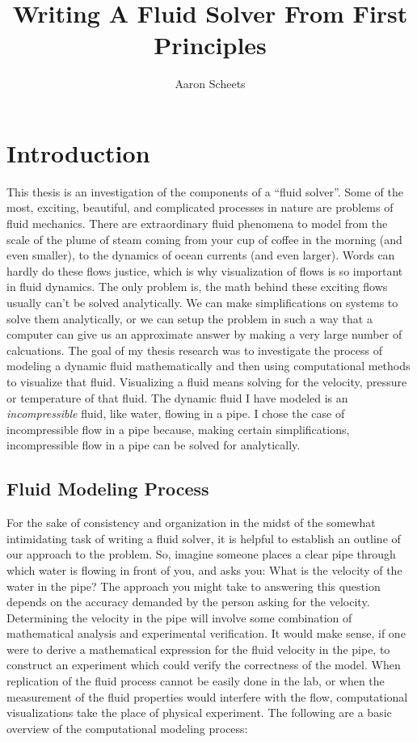 \documentclass[twocolumn,12pth]{article}
\title{Writing A Fluid Solver From First Principles}
\author{Aaron Scheets}
\begin{document}
\doublespacing

\maketitle

\section{Introduction}

This thesis is an investigation of the components of a ``fluid solver''.
Some of the most, exciting, beautiful, and complicated processes in nature are problems of fluid mechanics.
There are extraordinary fluid phenomena to model from the scale of the plume of steam coming from your cup of coffee in the morning (and even smaller), to the dynamics of ocean currents (and even larger).
Words can hardly do these flows justice, which is why visualization of flows is so important in fluid dynamics.
The only problem is, the math behind these exciting flows usually can't be solved analytically. 
We can make simplifications on systems to solve them analytically, or we can setup the problem in such a way that a computer can give us an approximate answer by making a very large number of calcuations.
The goal of my thesis research was to investigate the process of modeling a dynamic fluid mathematically and then using computational methods to visualize that fluid.
Visualizing a fluid means solving for the velocity, pressure or temperature of that fluid.
The dynamic fluid I have modeled is an \textit{incompressible} fluid, like water, flowing in a pipe. 
I chose the case of incompressible flow in a pipe because, making certain simplifications, incompressible flow in a pipe can be solved for analytically. 

\subsection{Fluid Modeling Process}

For the sake of consistency and organization in the midst of the somewhat intimidating task of writing a fluid solver, it is helpful to establish an outline of our approach to the problem.
So, imagine someone places a clear pipe through which water is flowing in front of you, and asks you: What is the velocity of the water in the pipe?
The approach you might take to answering this question depends on the accuracy demanded by the person asking for the velocity.
Determining the velocity in the pipe will involve some combination of mathematical analysis and experimental verification.
It would make sense, if one were to derive a mathematical expression for the fluid velocity in the pipe, to construct an experiment which could verify the correctness of the model.
When replication of the fluid process cannot be easily done in the lab, or when the measurement of the fluid properties would interfere with the flow, computational visualizations take the place of physical experiment.
The following are a basic overview of the computational modeling process:
\vspace{2mm}
\end{document}
